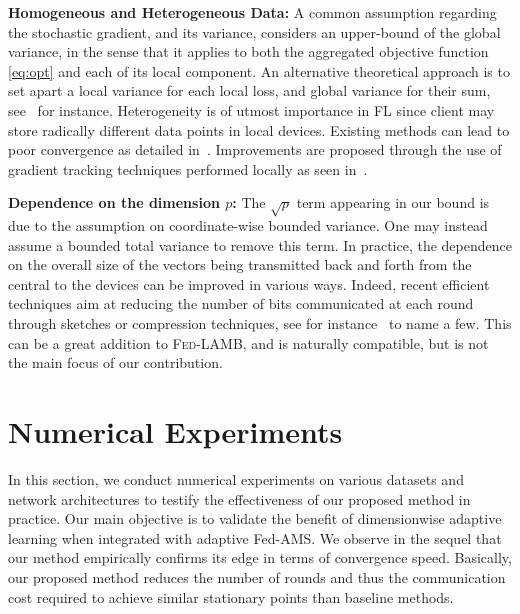 \documentclass[11pt]{article}
\newcommand{\algo}{\textsc{Fed-LAMB}}
\begin{document}
\medskip
\textbf{Homogeneous and Heterogeneous Data:} A common assumption regarding the stochastic gradient, and its variance, considers an upper-bound of the global variance, in the sense that it applies to both the aggregated objective function \eqref{eq:opt} and each of its local component. 
An alternative theoretical approach is to set apart a local variance for each local loss, and global variance for their sum, see~\cite{chen2020toward} for instance.
Heterogeneity is of utmost importance in FL since client may store radically different data points in local devices.
Existing methods can lead to poor convergence as detailed in~\cite{li2019federated,liang2019variance}. 
Improvements are proposed through the use of gradient tracking techniques performed locally as seen in~\cite{haddadpour2020federated,horvath2019stochastic,karimireddy2019scaffold}.

\medskip
\textbf{Dependence on the dimension $p$:} The $\sqrt p$ term appearing in our bound is due to the assumption on coordinate-wise bounded variance. One may instead assume a bounded total variance to remove this term. 
In practice, the dependence on the overall size of the vectors being transmitted back and forth from the central to the devices can be improved in various ways. Indeed, recent efficient techniques aim at reducing the number of bits communicated at each round through sketches or compression techniques, see for instance~\cite{haddadpour2020fedsketch,ivkin2019communication,li2019privacy} to name a few.
This can be a great addition to \algo, and is naturally compatible, but is not the main focus of our contribution.





\section{Numerical Experiments}\label{sec:numerical}

In this section, we conduct numerical experiments on various datasets and network architectures to testify the effectiveness of our proposed method in practice. Our main objective is to validate the benefit of dimensionwise adaptive learning when integrated with adaptive Fed-AMS.
We observe in the sequel that our method empirically confirms its edge in terms of convergence speed.
Basically, our proposed method reduces the number of rounds and thus the communication cost required to achieve similar stationary points than baseline methods. 
\end{document}
